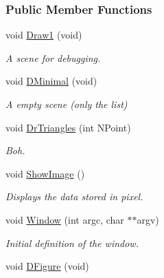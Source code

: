\subsubsection*{Public Member Functions}
\begin{DoxyCompactItemize}
\item 
void \hyperlink{classDraw_a6d1a6c1ede3d0e58cbf0534c9c3ba943}{Draw1} (void)\hypertarget{classDraw_a6d1a6c1ede3d0e58cbf0534c9c3ba943}{}\label{classDraw_a6d1a6c1ede3d0e58cbf0534c9c3ba943}

\begin{DoxyCompactList}\small\item\em A scene for debugging. \end{DoxyCompactList}\item 
void \hyperlink{classDraw_a13a208315366febdc9db2eefb5f354ab}{D\+Minimal} (void)\hypertarget{classDraw_a13a208315366febdc9db2eefb5f354ab}{}\label{classDraw_a13a208315366febdc9db2eefb5f354ab}

\begin{DoxyCompactList}\small\item\em A empty scene (only the list) \end{DoxyCompactList}\item 
void \hyperlink{classDraw_a4d4cb243d25c9778b824719fc01d8b68}{Dr\+Triangles} (int N\+Point)\hypertarget{classDraw_a4d4cb243d25c9778b824719fc01d8b68}{}\label{classDraw_a4d4cb243d25c9778b824719fc01d8b68}

\begin{DoxyCompactList}\small\item\em Boh. \end{DoxyCompactList}\item 
void \hyperlink{classDraw_aded17e5e58c8d26011c3d2120b259fed}{Show\+Image} ()\hypertarget{classDraw_aded17e5e58c8d26011c3d2120b259fed}{}\label{classDraw_aded17e5e58c8d26011c3d2120b259fed}

\begin{DoxyCompactList}\small\item\em Displays the data stored in pixel. \end{DoxyCompactList}\item 
void \hyperlink{classDraw_a6768324ebecaa6d87d6e65bf242b23f9}{Window} (int argc, char $\ast$$\ast$argv)\hypertarget{classDraw_a6768324ebecaa6d87d6e65bf242b23f9}{}\label{classDraw_a6768324ebecaa6d87d6e65bf242b23f9}

\begin{DoxyCompactList}\small\item\em Initial definition of the window. \end{DoxyCompactList}\item 
void \hyperlink{classDraw_aa74f5eca0e42920b3ae0766299b85617}{D\+Figure} (void)\hypertarget{classDraw_aa74f5eca0e42920b3ae0766299b85617}{}\label{classDraw_aa74f5eca0e42920b3ae0766299b85617}


\end{DoxyCompactItemize}
